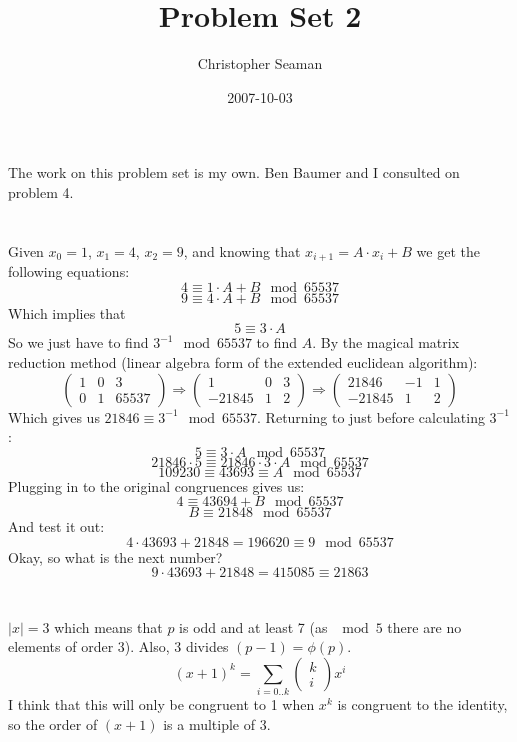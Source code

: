 \documentclass[]{article}
\title{Problem Set 2}
\author{Christopher Seaman}
\date{2007-10-03}
\begin{document}
\ifpdf
{}
\else
{}
\fi

\maketitle

	The work on this problem set is my own.  Ben Baumer and I consulted on problem 4.

\section{}
Given $x_0 = 1$, $x_1 = 4$, $x_2 = 9$, and knowing that $x_{i+1} = A\cdot x_i + B$ we get the following equations:
$$4 \equiv 1 \cdot A + B \mod 65537$$
$$9 \equiv 4 \cdot A + B \mod 65537$$
Which implies that
$$5 \equiv 3 \cdot A $$
So we just have to find $3^{-1} \mod 65537$ to find $A$.  By the magical matrix reduction method (linear algebra form of the extended euclidean algorithm):
$$
\begin{pmatrix}
	1 & 0 & 3\\
	0 & 1 & 65537
\end{pmatrix}
\Rightarrow
\begin{pmatrix}
	1 & 0 & 3\\
	-21845 & 1 & 2
\end{pmatrix}
\Rightarrow
\begin{pmatrix}
	21846 & -1 & 1\\
	-21845 & 1 & 2
\end{pmatrix}
$$
Which gives us $21846 \equiv 3^{-1} \mod 65537$.  Returning to just before calculating $3^{-1}$:
$$5 \equiv 3 \cdot A \mod 65537$$
$$21846 \cdot 5 \equiv 21846 \cdot 3 \cdot A \mod 65537$$
$$109230 \equiv 43693 \equiv A \mod 65537$$
Plugging in to the original congruences gives us:
$$4 \equiv 43694 + B \mod 65537$$
$$B \equiv 21848  \mod 65537$$
And test it out:
$$4 \cdot 43693 + 21848 = 196620 \equiv 9  \mod 65537$$
Okay, so what is the next number?
$$9 \cdot 43693 + 21848 = 415085 \equiv 21863$$

\section{}
\subsection{}
$\mid x \mid = 3$ which means that $p$ is odd and at least 7 (as $\mod 5$ there are no elements of order 3).  Also, 3 divides $(p-1) = \phi(p)$.
$$(x+1)^k = \sum_{i=0..k} 
\begin{pmatrix}
	k\\
	i
\end{pmatrix}
x^i$$
I think that this will only be congruent to 1 when $x^k$ is congruent to the identity, so the order of $(x + 1)$ is a multiple of 3.
\end{document}
